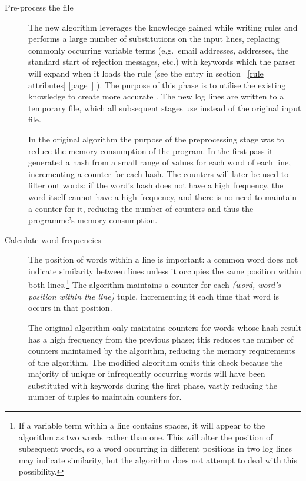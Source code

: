 \documentclass[a4paper,12pt,draft]{article}
\newcommand{\refwithpage}[1]{%
    \empty{}\ref{#1} [page~\pageref{#1}]%
}
\begin{document}
\begin{description}

    \item [Pre-process the file]  The new algorithm leverages the knowledge
        gained while writing rules and performs a large number of
        substitutions on the input lines, replacing commonly occurring
        variable terms (e.g.\ email addresses, \IP{} addresses, the
        standard start of rejection messages, etc.) with \regex{} keywords
        which the parser will expand when it loads the rule (see the
        \regex{} entry in section~\refwithpage{rule attributes}).  The
        purpose of this phase is to utilise the existing knowledge to
        create more accurate \regexes{}.  The new log lines are written to
        a temporary file, which all subsequent stages use instead of the
        original input file.

        In the original algorithm the purpose of the preprocessing stage
        was to reduce the memory consumption of the program.  In the first
        pass it generated a hash from a small range of values for each word
        of each line, incrementing a counter for each hash.  The counters
        will later be used to filter out words: if the word's hash does not
        have a high frequency, the word itself cannot have a high
        frequency, and there is no need to maintain a counter for it,
        reducing the number of counters and thus the programme's memory
        consumption.

    \item [Calculate word frequencies]  The position of words within a line
        is important: a common word does not indicate similarity between
        lines unless it occupies the same position within both
        lines.\footnote{If a variable term within a line contains spaces,
        it will appear to the algorithm as two words rather than one.  This
        will alter the position of subsequent words, so a word occurring in
        different positions in two log lines may indicate similarity, but
        the algorithm does not attempt to deal with this possibility.}  The
        algorithm maintains a counter for each \textit{(word, word's
        position within the line)\/} tuple, incrementing it each time that
        word is occurs in that position.

        The original algorithm only maintains counters for words whose hash
        result has a high frequency from the previous phase; this reduces
        the number of counters maintained by the algorithm, reducing the
        memory requirements of the algorithm.  The modified algorithm omits
        this check because the majority of unique or infrequently occurring
        words will have been substituted with keywords during the first
        phase, vastly reducing the number of tuples to maintain counters
        for.


\end{description}
\end{document}

